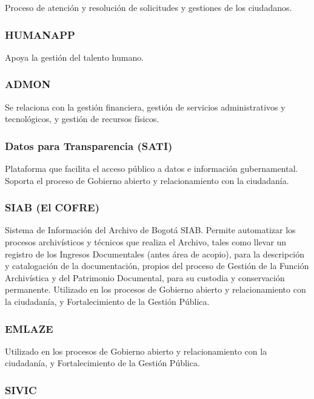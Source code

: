 \documentclass[
	a4paper, %
	12pt, %
]{include/CSSullivanBusinessReport}
\begin{document}
Proceso de atención y resolución de solicitudes y gestiones de los
ciudadanos.

\subsubsection{HUMANAPP}\label{sec:humanapp}

Apoya la gestión del talento humano.

\subsubsection{ADMON}\label{sec:admon}

Se relaciona con la gestión financiera, gestión de servicios
administrativos y tecnológicos, y gestión de recursos físicos.

\subsubsection{Datos para Transparencia
(SATI)}\label{sec:datos-para-transparencia-sati}

Plataforma que facilita el acceso público a datos e información
gubernamental. Soporta el proceso de Gobierno abierto y relacionamiento
con la ciudadanía.

\subsubsection{SIAB (El COFRE)}\label{sec:siab-el-cofre}

Sistema de Información del Archivo de Bogotá SIAB. Permite automatizar
los procesos archivísticos y técnicos que realiza el Archivo, tales como
llevar un registro de los Ingresos Documentales (antes área de acopio),
para la descripción y catalogación de la documentación, propios del
proceso de Gestión de la Función Archivística y del Patrimonio
Documental, para su custodia y conservación permanente. Utilizado en los
procesos de Gobierno abierto y relacionamiento con la ciudadanía, y
Fortalecimiento de la Gestión Pública.

\subsubsection{EMLAZE}\label{sec:emlaze}

Utilizado en los procesos de Gobierno abierto y relacionamiento con la
ciudadanía, y Fortalecimiento de la Gestión Pública.

\subsubsection{SIVIC}\label{sec:sivic}
\end{document}
